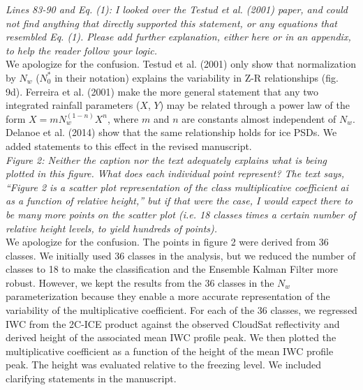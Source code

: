 \documentclass[12pt]{article}
\begin{document}
\newline
\textit{Lines 83-90 and Eq. (1): I looked over the Testud et al. (2001) paper, and could not find anything that directly
 supported this statement, or any equations that resembled Eq. (1). Please add further explanation, either here 
 or in an appendix, to help the reader follow your logic.}\\
\newline
We apologize for the confusion. Testud et al. (2001) only show that normalization by $N_w$ ($N_0^*$ in their notation) explains the variability
in Z-R relationships (fig. 9d). Ferreira et al. (2001) \cite{ferreira2001} make the more general statement that any two integrated rainfall parameters ($X$, $Y$) 
may be related through a power law of the form $X = m N_w^{(1-n)} X^n$, where $m$ and $n$ are constants almost independent of $N_w$. Delanoe et al. (2014)
 \cite{delanoe2014} show that the same relationship holds for ice PSDs. We added statements to this effect in the revised manuscript.\\
\newline
\textit{Figure 2: Neither the caption nor the text adequately explains what is being plotted in this figure. What does each 
individual point represent? The text says, “Figure 2 is a scatter plot representation of the class multiplicative 
coefficient ai as a function of relative height,” but if that were the case, I would expect there to be many more 
points on the scatter plot (i.e. 18 classes times a certain number of relative height levels, to yield hundreds of points).}\\
\newline
We apologize for the confusion.  The points in figure 2 were derived from 36 classes.  We initially used 36 classes in the analysis, but
we reduced the number of classes to 18 to make the classification and the Ensemble Kalman Filter more robust.  However, we kept the results from the
36 classes in the $N_w$ parameterization because they enable a more accurate representation of the variability of the multiplicative coefficient.
For each of the 36 classes, we regressed IWC from the 2C-ICE product against the observed CloudSat reflectivity and derived height of the associated
mean IWC profile peak.  We then plotted the multiplicative coefficient as a function of the height of the mean IWC profile peak.  The height was
evaluated relative to the freezing level.  We included clarifying statements in the manuscript.\\
\newline
\end{document}
